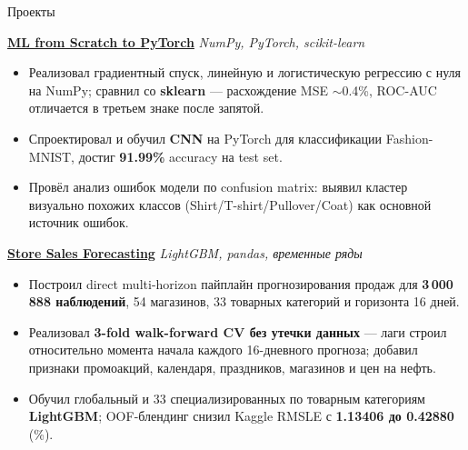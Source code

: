 \documentclass{resume} %
\begin{document}
\begin{rSection}{Проекты}

\item \textbf{\href{https://github.com/Antichnoste/ml-from-scratch-to-pytorch}{ML from Scratch to PyTorch}} \hfill \textit{NumPy, PyTorch, scikit-learn}
\begin{itemize}
    \itemsep -3pt {}
    \item Реализовал градиентный спуск, линейную и логистическую регрессию с нуля на NumPy; сравнил со \textbf{sklearn} — расхождение MSE $\sim$0.4\%, ROC-AUC отличается в третьем знаке после запятой.
    \item Спроектировал и обучил \textbf{CNN} на PyTorch для классификации Fashion-MNIST, достиг \textbf{91.99\%} accuracy на test set.
    \item Провёл анализ ошибок модели по confusion matrix: выявил кластер визуально похожих классов (Shirt/\allowbreak T-shirt/\allowbreak Pullover/\allowbreak Coat) как основной источник ошибок.
\end{itemize}

\item \textbf{\href{https://github.com/Antichnoste/store-sales-forecasting}{Store Sales Forecasting}} \hfill \textit{LightGBM, pandas, временные ряды}
\begin{itemize}
    \itemsep -3pt {}
    \item Построил direct multi-horizon пайплайн прогнозирования продаж для \textbf{3\,000\,888 наблюдений}, 54 магазинов, 33 товарных категорий и горизонта 16 дней.
    \item Реализовал \textbf{3-fold walk-forward CV без утечки данных} — лаги строил относительно момента начала каждого 16-дневного прогноза; добавил признаки промоакций, календаря, праздников, магазинов и цен на нефть.
    \item Обучил глобальный и 33 специализированных по товарным категориям \textbf{LightGBM}; OOF-блендинг снизил Kaggle RMSLE с \textbf{1.13406 до 0.42880} (\%).
\end{itemize}

\end{rSection} 
\end{document}
